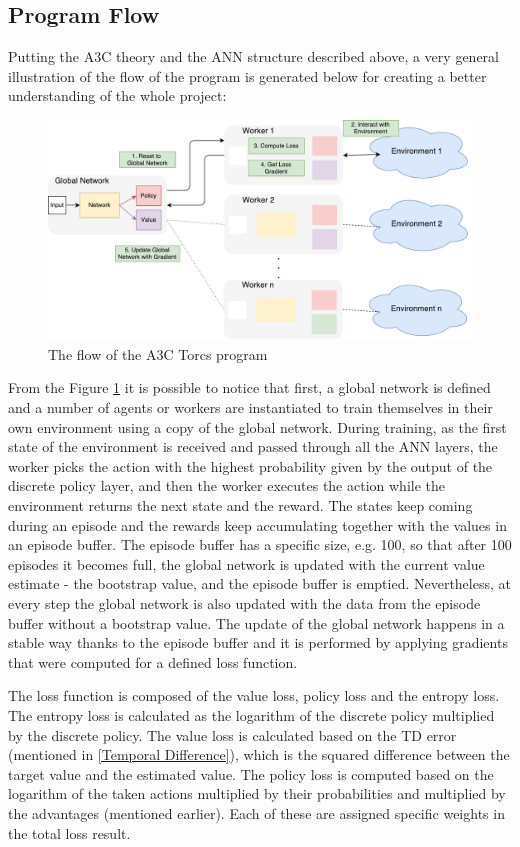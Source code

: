 \subsection{Program Flow}
Putting the A3C theory and the ANN structure described above, a very general illustration of the flow of the program is generated below for creating a better understanding of the whole project:
\begin{figure}[H]
	\centering
	\includegraphics[width=1.25\textwidth]{Figures/Flow}
	\caption{The flow of the A3C Torcs program}
	\label{Flow}
\end{figure}
From the Figure \ref{Flow} it is possible to notice that first, a global network is defined and a number of agents or workers are instantiated to train themselves in their own environment using a copy of the global network. During training, as the first state of the environment is received and passed through all the ANN layers, the worker picks the action with the highest probability given by the output of the discrete policy layer, and then the worker executes the action while the environment returns the next state and the reward. The states keep coming during an episode and the rewards keep accumulating together with the values in an episode buffer. The episode buffer has a specific size, e.g. 100, so that after 100 episodes it becomes full, the global network is updated with the current value estimate - the bootstrap value, and the episode buffer is emptied. Nevertheless, at every step the global network is also updated with the data from the episode buffer without a bootstrap value. The update of the global network happens in a stable way thanks to the episode buffer and it is performed by applying gradients that were computed for a defined loss function.

The loss function is composed of the value loss, policy loss and the entropy loss. The entropy loss is calculated as the logarithm of the discrete policy multiplied by the discrete policy. The value loss is calculated based on the TD error (mentioned in \ref{Temporal Difference}), which is the squared difference between the target value and the estimated value. The policy loss is computed based on the logarithm of the taken actions multiplied by their probabilities and multiplied by the advantages (mentioned earlier). Each of these are assigned specific weights in the total loss result. 

